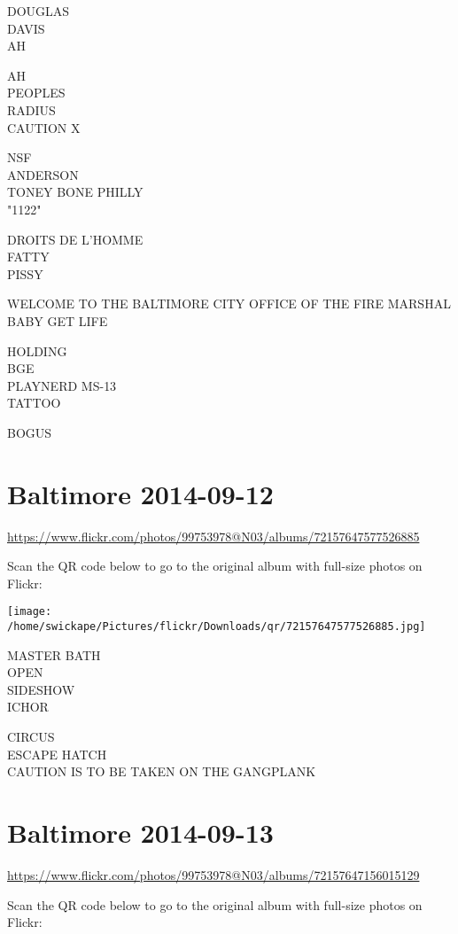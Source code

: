 \documentclass[10pt,letterpaper]{article}
\begin{document}
DOUGLAS\\
DAVIS\\
AH

AH\\
PEOPLES\\
RADIUS\\
CAUTION X

NSF\\
ANDERSON\\
TONEY BONE PHILLY\\
"1122"

DROITS DE L'HOMME\\
FATTY\\
PISSY

WELCOME TO THE BALTIMORE CITY OFFICE OF THE FIRE MARSHAL\\
BABY GET LIFE

HOLDING\\
BGE\\
PLAYNERD MS{-}13\\
TATTOO

BOGUS
\pagebreak

\section*{Baltimore 2014-09-12}

\url{https://www.flickr.com/photos/99753978@N03/albums/72157647577526885}

Scan the QR code below to go to the original album with full-size photos on Flickr:

\texttt{[image: /home/swickape/Pictures/flickr/Downloads/qr/72157647577526885.jpg]}
\pagebreak

MASTER BATH\\
OPEN\\
SIDESHOW\\
ICHOR

CIRCUS\\
ESCAPE HATCH\\
CAUTION IS TO BE TAKEN ON THE GANGPLANK
\pagebreak

\section*{Baltimore 2014-09-13}

\url{https://www.flickr.com/photos/99753978@N03/albums/72157647156015129}

Scan the QR code below to go to the original album with full-size photos on Flickr:
\end{document}
